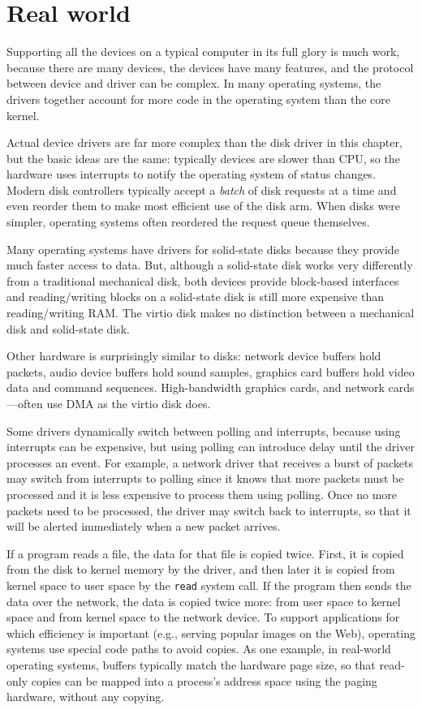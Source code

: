 \section{Real world}

Supporting all the devices on a typical computer in its full glory is
much work, because there are many devices, the devices have many
features, and the protocol between device and driver can be complex.
In many operating systems, the drivers together account for more code
in the operating system than the core kernel.

Actual device drivers are far more complex than the disk driver in this chapter,
but the basic ideas are the same:
typically devices are slower than CPU, so the hardware uses
interrupts to notify the operating system of status changes.
Modern disk controllers typically
accept a 
\textit{batch} 
of disk requests at a time and even reorder
them to make most efficient use of the disk arm.
When disks were simpler, operating systems often reordered the
request queue themselves.

Many operating systems have drivers for solid-state disks because they
provide much faster access to data.  But, although a solid-state disk
works very differently from a traditional mechanical disk, both
devices provide block-based interfaces and reading/writing blocks on a
solid-state disk is still more expensive than reading/writing RAM.
The virtio disk makes no distinction between a mechanical disk and
solid-state disk.

Other hardware is surprisingly similar to disks: network device
buffers hold packets, audio device buffers hold sound samples,
graphics card buffers hold video data and command sequences.
High-bandwidth graphics cards, and network cards—often use DMA
as the virtio disk does.

Some drivers dynamically switch between polling and interrupts, because using
interrupts can be expensive, but using polling can introduce delay until the
driver processes an event.  For example, a network driver that receives a
burst of packets may switch from interrupts to polling since it knows that more
packets must be processed and it is less expensive to process them using polling.
Once no more packets need to be processed, the driver may switch back to
interrupts, so that it will be alerted immediately when a new packet arrives.

If a program reads a file, the data for that file is copied twice.  First, it
is copied from the disk to kernel memory by the driver, and then later it is
copied from kernel space to user space by the 
\lstinline{read}
system call.  If the program then sends the data over the network, 
the data is copied twice more: from user space to kernel space and from
kernel space to the network device.  To support applications for which 
efficiency is important (e.g., serving popular images on the Web), operating systems
use special code paths to avoid copies.  As one example,
in real-world operating systems, 
buffers typically match the hardware page size, so that
read-only copies can be mapped into a process's address space
using the paging hardware, without any copying.

